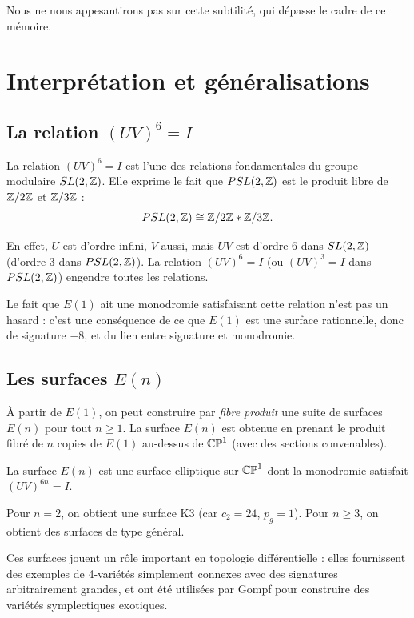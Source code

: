 Nous ne nous appesantirons pas sur cette subtilité, qui dépasse le cadre de ce mémoire.

\section{Interprétation et généralisations}

\subsection{La relation $(UV)^6 = I$}

La relation $(UV)^6 = I$ est l'une des relations fondamentales du groupe modulaire $SL(2,\mathbb{Z})$. Elle exprime le fait que $PSL(2,\mathbb{Z})$ est le produit libre de $\mathbb{Z}/2\mathbb{Z}$ et $\mathbb{Z}/3\mathbb{Z}$ :
\[
PSL(2,\mathbb{Z}) \cong \mathbb{Z}/2\mathbb{Z} * \mathbb{Z}/3\mathbb{Z}.
\]

En effet, $U$ est d'ordre infini, $V$ aussi, mais $UV$ est d'ordre 6 dans $SL(2,\mathbb{Z})$ (d'ordre 3 dans $PSL(2,\mathbb{Z})$). La relation $(UV)^6 = I$ (ou $(UV)^3 = I$ dans $PSL(2,\mathbb{Z})$) engendre toutes les relations.

Le fait que $E(1)$ ait une monodromie satisfaisant cette relation n'est pas un hasard : c'est une conséquence de ce que $E(1)$ est une surface rationnelle, donc de signature $-8$, et du lien entre signature et monodromie.

\subsection{Les surfaces $E(n)$}

À partir de $E(1)$, on peut construire par \emph{fibre produit} une suite de surfaces $E(n)$ pour tout $n \ge 1$. La surface $E(n)$ est obtenue en prenant le produit fibré de $n$ copies de $E(1)$ au-dessus de $\mathbb{CP}^1$ (avec des sections convenables).

\begin{proposition}
La surface $E(n)$ est une surface elliptique sur $\mathbb{CP}^1$ dont la monodromie satisfait $(UV)^{6n} = I$.
\end{proposition}

Pour $n=2$, on obtient une surface K3 (car $c_2 = 24$, $p_g = 1$). Pour $n \ge 3$, on obtient des surfaces de type général.

Ces surfaces jouent un rôle important en topologie différentielle : elles fournissent des exemples de 4-variétés simplement connexes avec des signatures arbitrairement grandes, et ont été utilisées par Gompf pour construire des variétés symplectiques exotiques.

